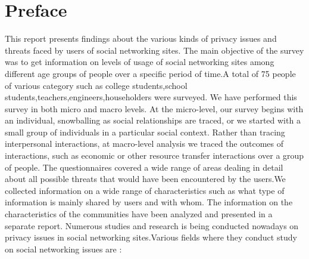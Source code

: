 \documentclass{book}
\begin{document}
\chapter*{Preface}

This  report  presents  findings about the various kinds of privacy issues and  threats faced by users of social networking sites. The main objective of the survey was to get information on levels of usage of social networking sites among different age groups of people over a specific period of time.A total of 75 people of various category such as college students,school students,teachers,engineers,householders were surveyed.
We have performed this survey in both micro and macro levels. At the micro-level, our survey begins with an individual, snowballing as social relationships are traced, or we started  with a small group of individuals in a particular social context. Rather than tracing interpersonal interactions, at macro-level analysis we  traced the outcomes of interactions, such as economic or other resource transfer interactions over a group of people.
The questionnaires covered a wide range of areas dealing in detail about all possible threats that would have been encountered by the users.We collected information on a wide range of  characteristics such as what type of information is mainly shared by users and  with whom. The information on the characteristics of the communities have been analyzed and presented in a separate report.
Numerous studies and research is being conducted nowadays on privacy issues in social networking sites.Various fields where they conduct study on social networking issues are :
\end{document}
